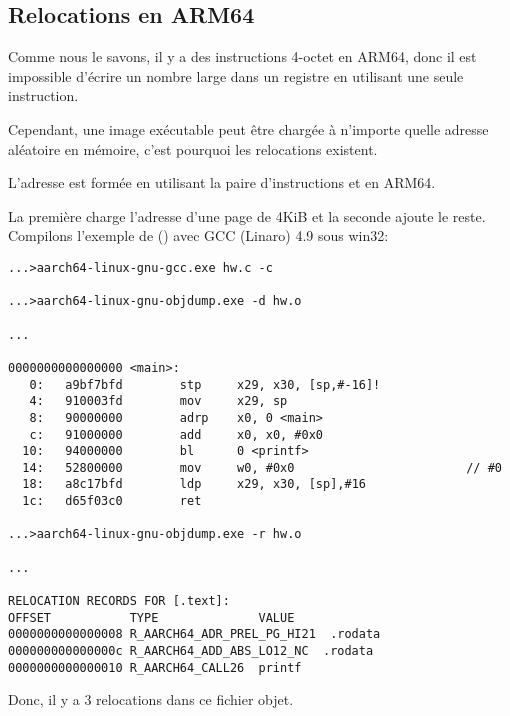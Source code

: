 ﻿\newcommand{\ARMELF}{\InSqBrackets{\IT{ELF for the ARM 64-bit Architecture (AArch64)}, (2013)}\footnote{\AlsoAvailableAs \url{http://go.yurichev.com/17288}}}

\subsection{Relocations en ARM64}
\label{ARM64_relocs}

Comme nous le savons, il y a des instructions 4-octet en ARM64, donc il est impossible
d'écrire un nombre large dans un registre en utilisant une seule instruction.

Cependant, une image exécutable peut être chargée à n'importe quelle adresse aléatoire
en mémoire, c'est pourquoi les relocations existent.


L'adresse est formée en utilisant la paire d'instructions  et \ADD en ARM64.

La première charge l'adresse d'une page de 4KiB et la seconde ajoute le reste.
Compilons l'exemple de \q{\HelloWorldSectionName} () avec GCC (Linaro)
4.9 sous win32:

\begin{lstlisting}[caption=GCC (Linaro) 4.9 et objdump du fichier objet,style=customasmARM]
...>aarch64-linux-gnu-gcc.exe hw.c -c

...>aarch64-linux-gnu-objdump.exe -d hw.o

...

0000000000000000 <main>:
   0:   a9bf7bfd        stp     x29, x30, [sp,#-16]!
   4:   910003fd        mov     x29, sp
   8:   90000000        adrp    x0, 0 <main>
   c:   91000000        add     x0, x0, #0x0
  10:   94000000        bl      0 <printf>
  14:   52800000        mov     w0, #0x0                        // #0
  18:   a8c17bfd        ldp     x29, x30, [sp],#16
  1c:   d65f03c0        ret

...>aarch64-linux-gnu-objdump.exe -r hw.o

...

RELOCATION RECORDS FOR [.text]:
OFFSET           TYPE              VALUE
0000000000000008 R_AARCH64_ADR_PREL_PG_HI21  .rodata
000000000000000c R_AARCH64_ADD_ABS_LO12_NC  .rodata
0000000000000010 R_AARCH64_CALL26  printf
\end{lstlisting}

Donc, il y a 3 relocations dans ce fichier objet.

